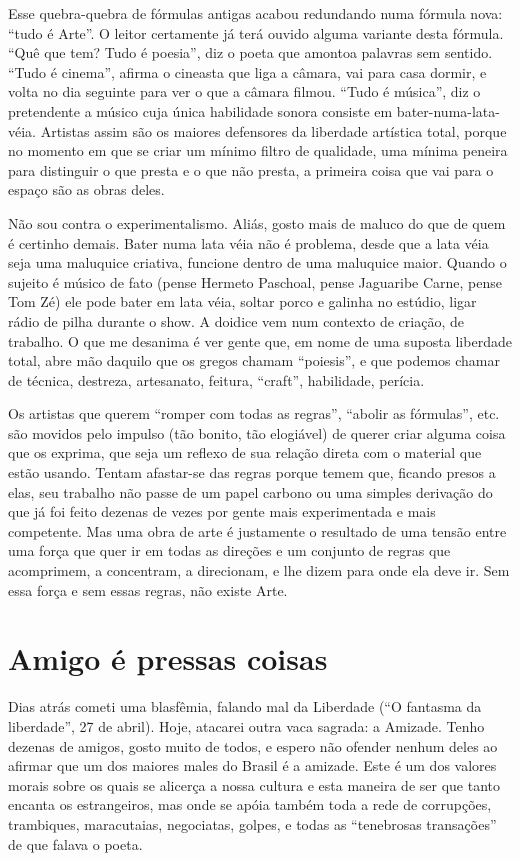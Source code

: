 Esse quebra-quebra de fórmulas antigas acabou redundando numa fórmula
nova: “tudo é Arte”.  O leitor certamente já terá ouvido alguma
variante desta fórmula. “Quê que tem? Tudo é poesia”, diz o poeta que
amontoa palavras sem sentido. “Tudo é cinema”, afirma o cineasta que
liga a câmara, vai para casa dormir, e volta no dia seguinte para ver
o que a câmara filmou. “Tudo é música”, diz o pretendente a músico
cuja única habilidade sonora consiste em bater-numa-lata-véia. 
Artistas assim são os maiores defensores da liberdade artística
total, porque no momento em que se criar um mínimo filtro de
qualidade, uma mínima peneira para distinguir o que presta e o que
não presta, a primeira coisa que vai para o espaço são as obras
deles.

Não sou contra o experimentalismo. Aliás, gosto mais de maluco do que
de quem é certinho demais. Bater numa lata véia não é problema, desde
que a lata véia seja uma maluquice criativa, funcione dentro de uma
maluquice maior. Quando o sujeito é músico de fato (pense Hermeto
Paschoal, pense Jaguaribe Carne, pense Tom Zé) ele pode bater em lata
véia, soltar porco e galinha no estúdio, ligar rádio de pilha durante
o show. A doidice vem num contexto de criação, de trabalho. O que me
desanima é ver gente que, em nome de uma suposta liberdade total,
abre mão daquilo que os gregos chamam “poiesis”, e que podemos chamar
de técnica, destreza, artesanato, feitura, “craft”, habilidade,
perícia.

Os artistas que querem “romper com todas as regras”, “abolir as
fórmulas”, etc. são movidos pelo impulso (tão bonito, tão elogiável)
de querer criar alguma coisa que os exprima, que seja um reflexo de
sua relação direta com o material que estão usando. Tentam afastar-se
das regras porque temem que, ficando presos a elas, seu trabalho não
passe de um papel carbono ou uma simples derivação do que já foi
feito dezenas de vezes por gente mais experimentada e mais
competente. Mas uma obra de arte é justamente o resultado de uma
tensão entre uma força que quer ir em todas as direções e um conjunto
de regras que acomprimem, a concentram, a direcionam, e lhe dizem
para onde ela deve ir. Sem essa força e sem essas regras, não existe
Arte.

\chapter{Amigo é pressas coisas}

Dias atrás cometi uma blasfêmia, falando mal da Liberdade (“O fantasma
da liberdade”, 27 de abril). Hoje, atacarei outra vaca sagrada: a
Amizade. Tenho dezenas de amigos, gosto muito de todos, e espero não
ofender nenhum deles ao afirmar que um dos maiores males do Brasil é
a amizade. Este é um dos valores morais sobre os quais se alicerça a
nossa cultura e esta maneira de ser que tanto encanta os
estrangeiros, mas onde se apóia também toda a rede de corrupções,
trambiques, maracutaias, negociatas, golpes, e todas as “tenebrosas
transações” de que falava o poeta.

